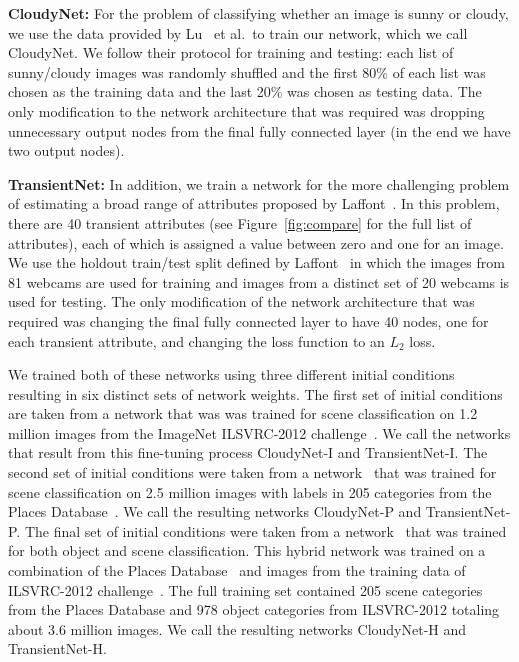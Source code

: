 \documentclass{article}
\newcommand{\figref}[1]{Figure~\ref{fig:#1}}
\begin{document}
\textbf{CloudyNet:} For the problem of classifying whether an image is
sunny or cloudy, we use the data provided by Lu~\cite{lutwoclass} et
al.\ to train our network, which we call CloudyNet.  We follow their
protocol for training and testing: each list of sunny/cloudy images
was randomly shuffled and the first 80\% of each list was chosen as
the training data and the last 20\% was chosen as testing data.  The
only modification to the network architecture that was required was
dropping unnecessary output nodes from the final fully connected layer
(in the end we have two output nodes).

\textbf{TransientNet:} In addition, we train a network for the more
challenging problem of estimating a broad range of attributes proposed
by Laffont~\cite{Laffont14}.  In this problem, there are 40 transient
attributes (see \figref{compare} for the full list of
attributes), each of which is assigned a value between zero and one
for an image. We use the holdout train/test split defined by
Laffont~\cite{Laffont14} in which the images from 81 webcams are used
for training and images from a distinct set of 20 webcams is used for
testing.  The only modification of the network architecture that was
required was changing the final fully connected layer to have 40
nodes, one for each transient attribute, and changing the loss
function to an $L_2$ loss. 

We trained both of these networks using three different initial
conditions resulting in six distinct sets of network weights. The
first set of initial conditions are taken from a network that was was
trained for scene classification on 1.2 million images from the
ImageNet ILSVRC-2012 challenge~\cite{ILSVRCarxiv14}.  We call the
networks that result from this fine-tuning process CloudyNet-I and
TransientNet-I.  The second set of initial conditions were taken from
a network~\cite{zhou2014places} that was trained for scene classification
on 2.5 million images with labels in 205 categories from the Places
Database~\cite{zhou2014places}. We call the resulting networks
CloudyNet-P and TransientNet-P.  The final set of initial conditions
were taken from a network~\cite{zhou2014places} that was trained for
both object and scene classification.  This hybrid network was trained
on a combination of the Places Database~\cite{zhou2014places} and
images from the training data of ILSVRC-2012
challenge~\cite{ILSVRCarxiv14}.  The full training set contained 205
scene categories from the Places Database and 978 object categories
from ILSVRC-2012 totaling about 3.6 million images.  We call the
resulting networks CloudyNet-H and TransientNet-H.
\end{document}
